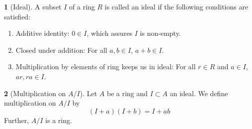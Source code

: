 \documentclass[12pt]{article}
\theoremstyle{definition}
\newtheorem{definition}{\color{NavyBlue}{\textbf{Definition}}}
\begin{document}
\begin{definition}[Ideal]
A subset $I$ of a ring $R$ is called an ideal if the following conditions are satisfied:
\begin{enumerate}
\item Additive identity: $0 \in I$, which assures $I$ is non-empty.
\item Closed under addition: For all $a,b \in I$, $a+b \in I$.
\item Multiplication by elements of ring keeps us in ideal: For all $r \in R$ and $a \in I$, $ar, ra \in I$.
\end{enumerate}
\end{definition}

\begin{definition}[Multiplication on $A/I$]
Let $A$ be a ring and $I \subset A$ an ideal. We define multiplication on $A/I$ by
\begin{equation}
(I+a)(I+b) = I + ab
\end{equation}
Further, $A/I$ is a ring.
\end{definition}
\end{document}
